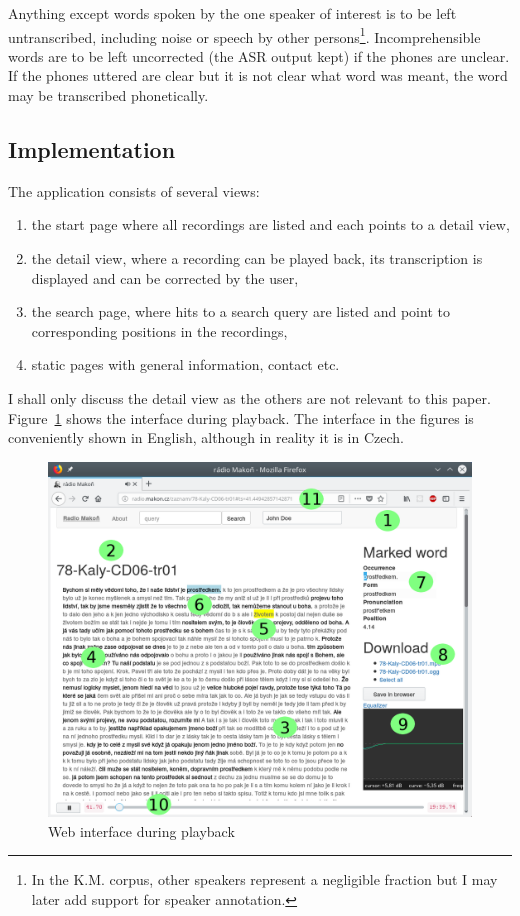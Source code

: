 \documentclass[12pt,a4paper]{report}
\begin{document}
Anything except words spoken by the one speaker of interest is to be left
untranscribed, including noise or speech by other persons\footnote{In the K.M.
corpus,
other speakers represent a negligible fraction but I may later add support for
speaker annotation.}. Incomprehensible words are to be left uncorrected
(the ASR output kept) if the phones are unclear. If the phones uttered are clear
but it is not clear what word was meant, the word may be transcribed
phonetically.

\subsection{Implementation}

The application consists of several views:
\begin{enumerate}
\item{the start page where all recordings are listed and each points to a detail
view,}
\item{the detail view, where a recording can be played back, its transcription
is displayed and can be corrected by the user,}
\item{the search page, where hits to a search query are listed and point to
corresponding positions in the recordings,}
\item{static pages with general information, contact etc.}
\end{enumerate}

I shall only discuss the detail view as the others are not relevant to this
paper. Figure~\ref{fig:scn1lab} shows the interface during playback.
The interface in the figures is conveniently shown in English, although in
reality it is in Czech.

\begin{figure}[htpb]
\includegraphics[scale=0.6]{rc/radio-makon-en-1-lab.png}
\caption{Web interface during playback}
\label{fig:scn1lab}
\end{figure}
\end{document}
